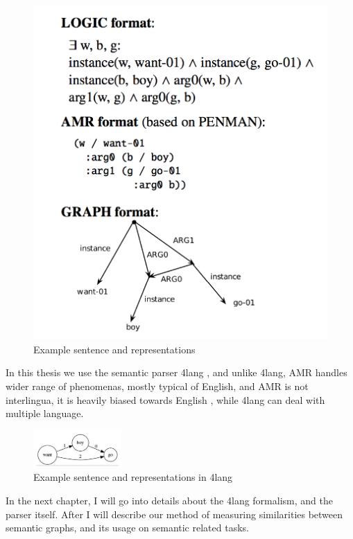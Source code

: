   \begin{figure}[h]
 	\centering
 	\includegraphics[height=0.4\textwidth]{figures/amr}
 	\caption{Example sentence and representations}
 	\label{fig:amr}
 \end{figure}

In this thesis we use the semantic parser 4lang \cite{Recski:2015b}, and unlike 4lang, AMR handles wider range of phenomenas, mostly typical of English, and AMR is not interlingua, it is heavily biased towards English \cite{Palmer:2005}, while 4lang can deal with multiple language.
 
   \begin{figure}[h]
 	\centering
 	\includegraphics[width=0.3\textwidth]{figures/4langboy}
 	\caption{Example sentence and representations in 4lang}
 	\label{fig:4langboy}
 \end{figure}
 
In the next chapter, I will go into details about the 4lang formalism, and the parser itself. After I will describe our method of measuring similarities between semantic graphs, and its usage on semantic related tasks.